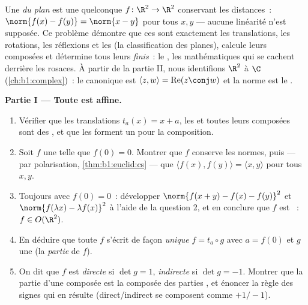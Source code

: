 \begin{problem}\label{pb:b1:euclid:1}
Une \emph{ du plan} est une  quelconque $f
\colon \R^2 \to \R^2$ conservant les distances~: $\norm{f(x) -
f(y)} = \norm{x - y}$ pour tous $x, y$ --- aucune linéarité n'est
supposée. Ce problème démontre que ces  sont
exactement les translations, les rotations, les réflexions et les
 (la classification des  planes),
calcule leurs composées et détermine tous leurs 
\emph{finis}~: le , les mathématiques
qui se cachent derrière les rosaces. À partir de la partie II, nous
identifions $\R^2$ à $\C$ (\cref{ch:b1:complex})~: le  canonique est $\langle z, w\rangle =
\operatorname{Re}(z\conj w)$ et la norme est le
.

\medskip
\noindent\textbf{Partie I --- Toute  est affine.}
\begin{enumerate}
  \item Vérifier que les translations $t_a(x) = x + a$, les
          et toutes leurs composées sont des
        , et que les  forment un  pour
        la composition.
  \item Soit $f$ une  telle que $f(0) = 0$. Montrer que
        $f$ conserve les normes, puis --- par polarisation,
        \cref{thm:b1:euclid:cs} --- que $\langle f(x),
        f(y)\rangle = \langle x, y\rangle$ pour tous $x, y$.
  \item Toujours avec $f(0) = 0$~: développer $\norm{f(x + y) -
        f(x) - f(y)}^2$ et $\norm{f(\lambda x) - \lambda f(x)}^2$
        à l'aide de la question 2, et en conclure que $f$ est
        \emph{}~: $f \in O(\R^2)$.
  \item En déduire que toute  $f$ s'écrit de façon
        \emph{unique} $f = t_a \circ g$ avec $a = f(0)$ et $g$
        une   (la \emph{partie } de $f$).
  \item On dit que $f$ est \emph{directe} si $\det g = 1$,
        \emph{indirecte} si $\det g = -1$. Montrer que la partie
         d'une composée est la composée des parties
        , et énoncer la règle des signes qui en résulte
        (direct/indirect se composent comme $+1/-1$).
\end{enumerate}


\end{problem}
